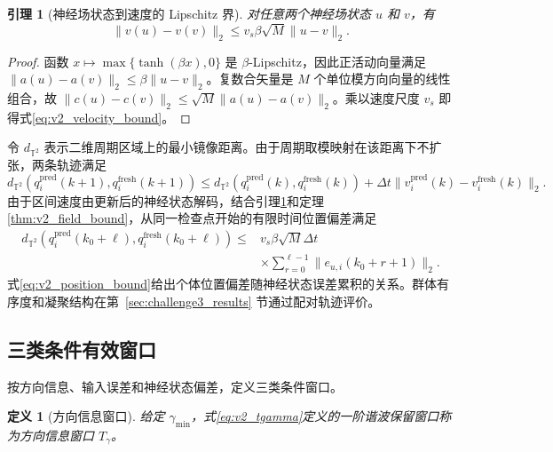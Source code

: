 \documentclass[UTF8,fontset=windows,11pt]{ctexart}
\newtheorem{lemma}[theorem]{引理}
\newtheorem{definition}[theorem]{定义}
\newcommand{\Ttwo}{\mathbb T^2}
\begin{document}
\begin{lemma}[神经场状态到速度的 Lipschitz 界]
\label{lem:v2_velocity_bound}
对任意两个神经场状态 $u$ 和 $v$，有
\begin{equation}
 \|v(u)-v(v)\|_2
 \le v_s\beta\sqrt M\|u-v\|_2.
 \label{eq:v2_velocity_bound}
\end{equation}
\end{lemma}

\begin{proof}
函数 $x\mapsto\max\{\tanh(\beta x),0\}$ 是 $\beta$-Lipschitz，因此正活动向量满足
\(\|a(u)-a(v)\|_2\le\beta\|u-v\|_2\)。复数合矢量是 $M$ 个单位模方向向量的线性组合，故
\(\|c(u)-c(v)\|_2\le\sqrt M\|a(u)-a(v)\|_2\)。乘以速度尺度 $v_s$ 即得式\eqref{eq:v2_velocity_bound}。
\end{proof}

令 $d_{\Ttwo}$ 表示二维周期区域上的最小镜像距离。由于周期取模映射在该距离下不扩张，两条轨迹满足
\begin{equation}
 d_{\Ttwo}(q_i^{\mathrm{pred}}(k+1),q_i^{\mathrm{fresh}}(k+1))
 \le d_{\Ttwo}(q_i^{\mathrm{pred}}(k),q_i^{\mathrm{fresh}}(k))
 +\Delta t\|v_i^{\mathrm{pred}}(k)-v_i^{\mathrm{fresh}}(k)\|_2.
 \label{eq:v2_position_step}
\end{equation}
由于区间速度由更新后的神经状态解码，结合引理\ref{lem:v2_velocity_bound}和定理\ref{thm:v2_field_bound}，从同一检查点开始的有限时间位置偏差满足
\begin{equation}
 \begin{aligned}
 d_{\Ttwo}(q_i^{\mathrm{pred}}(k_0+\ell),q_i^{\mathrm{fresh}}(k_0+\ell))
 \le{}&v_s\beta\sqrt M\Delta t\\
 &\times\sum_{r=0}^{\ell-1}\|e_{u,i}(k_0+r+1)\|_2.
 \end{aligned}
 \label{eq:v2_position_bound}
\end{equation}
式\eqref{eq:v2_position_bound}给出个体位置偏差随神经状态误差累积的关系。群体有序度和凝聚结构在第~\ref{sec:challenge3_results} 节通过配对轨迹评价。

\subsection{三类条件有效窗口}

按方向信息、输入误差和神经状态偏差，定义三类条件窗口。

\begin{definition}[方向信息窗口]
\label{def:v2_direction_window}
给定 $\gamma_{\min}$，式\eqref{eq:v2_tgamma}定义的一阶谐波保留窗口称为方向信息窗口 $T_\gamma$。
\end{definition}
\end{document}
